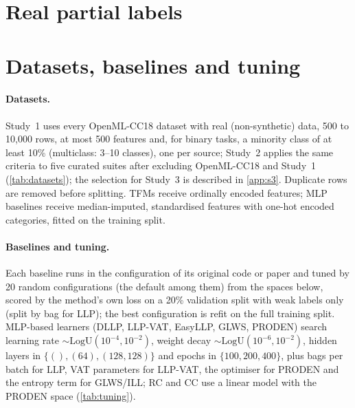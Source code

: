 \FloatBarrier
\section{Real partial labels}\label{app:real}
\begin{table}[!htbp]
\centering
\caption{Real partial labels (Study~1, TabICL~v2 for all TFM-based methods): accuracy averaged over 10 random 90/10
splits, and mean rank over all splits of the three datasets among the ten ranked methods (\ours{}, naive TFM and eight
baselines). Bold: best non-oracle accuracy.}
\label{tab:real}
\small

\end{table}

\FloatBarrier
\section{Datasets, baselines and tuning}\label{app:data}
\paragraph{Datasets.} Study~1 uses every OpenML-CC18 dataset with real (non-synthetic) data, 500 to 10{,}000 rows, at
most 500 features and, for binary tasks, a minority class of at least 10\% (multiclass: 3--10 classes), one per source;
Study~2 applies the same criteria to five curated suites after excluding OpenML-CC18 and Study~1
(\cref{tab:datasets}); the selection for Study~3 is described in \cref{app:s3}. Duplicate rows are removed before splitting. TFMs receive ordinally encoded features; MLP
baselines receive median-imputed, standardised features with one-hot encoded categories, fitted on the training split.

\paragraph{Baselines and tuning.} Each baseline runs in the configuration of its original code or paper and tuned by 20
random configurations (the default among them) from the spaces below, scored by the method's own loss on a 20\%
validation split with weak labels only (split by bag for LLP); the best configuration is refit on the full training
split. MLP-based learners (DLLP, LLP-VAT, EasyLLP, GLWS, PRODEN) search learning rate $\sim\mathrm{LogU}(10^{-4},10^{-2})$,
weight decay $\sim\mathrm{LogU}(10^{-6},10^{-2})$, hidden layers in $\{(),(64),(128,128)\}$ and epochs in
$\{100,200,400\}$, plus bags per batch for LLP, VAT parameters for LLP-VAT, the optimiser for PRODEN and the entropy
term for GLWS/ILL; RC and CC use a linear model with the PRODEN space (\cref{tab:tuning}).

